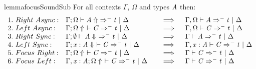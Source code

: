 \begin{restatable}{lemma}{focusSoundSub}
For all contexts $\Gamma$, $\Omega$ and types $\mathit{A}$
then:
\begin{align*}
\begin{array}{lll}
 1.\ Right\ Async: & \Gamma  ;  \Omega  \vdash   \GRANULEnt{A}  \Uparrow\   \Rightarrow^{-}  \GRANULEnt{t}  \ |\  \Delta \quad &\implies \quad \Gamma  \GRANULEsym{,}  \Omega  \vdash  \GRANULEnt{A}  \Rightarrow^-  \GRANULEnt{t} \ |\  \Delta\\
 2.\ Left\ Async: & \Gamma  ;   \Omega  \Uparrow\   \vdash  \GRANULEnt{C}  \Rightarrow^{-}  \GRANULEnt{t}  \ |\  \Delta \quad &\implies \quad \Gamma  \GRANULEsym{,}  \Omega  \vdash  \GRANULEnt{C}  \Rightarrow^-  \GRANULEnt{t} \ |\  \Delta\\
 3.\ Right\ Sync: & \Gamma  ;   \emptyset   \vdash   \GRANULEnt{A}  \Downarrow\   \Rightarrow^{-}  \GRANULEnt{t}  \ |\  \Delta \quad &\implies \quad \Gamma  \vdash  \GRANULEnt{A}  \Rightarrow^-  \GRANULEnt{t} \ |\  \Delta\\
 4.\ Left\ Sync: & \Gamma  ;     \GRANULEmv{x}  :  \GRANULEnt{A}    \Downarrow\   \vdash  \GRANULEnt{C}  \Rightarrow^{-}  \GRANULEnt{t}  \ |\  \Delta \quad &\implies \quad \Gamma  \GRANULEsym{,}   \GRANULEmv{x}  :  \GRANULEnt{A}   \vdash  \GRANULEnt{C}  \Rightarrow^-  \GRANULEnt{t} \ |\  \Delta\\
 5.\ Focus\ Right: & \Gamma  ;   \Omega  \Uparrow\   \vdash  \GRANULEnt{C}  \Rightarrow^{-}  \GRANULEnt{t}  \ |\  \Delta \quad &\implies \quad \Gamma  \vdash  \GRANULEnt{C}  \Rightarrow^-  \GRANULEnt{t} \ |\  \Delta\\
 6.\ Focus\ Left: & \Gamma  \GRANULEsym{,}   \GRANULEmv{x}  :  \GRANULEnt{A}   ;   \Omega  \Uparrow\   \vdash  \GRANULEnt{C}  \Rightarrow^{-}  \GRANULEnt{t}  \ |\  \Delta \quad &\implies \quad \Gamma  \vdash  \GRANULEnt{C}  \Rightarrow^-  \GRANULEnt{t} \ |\  \Delta
\end{array}
\end{align*}
\end{restatable}
